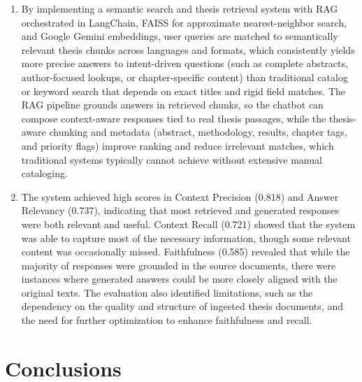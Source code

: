\begin{refsection}
\begin{enumerate}
    \item By implementing a semantic search and thesis retrieval system with RAG orchestrated in LangChain, FAISS for approximate nearest-neighbor search, and Google Gemini embeddings, user queries are matched to semantically relevant thesis chunks across languages and formats, which consistently yields more precise answers to intent-driven questions (such as complete abstracts, author-focused lookups, or chapter-specific content) than traditional catalog or keyword search that depends on exact titles and rigid field matches. The RAG pipeline grounds answers in retrieved chunks, so the chatbot can compose context-aware responses tied to real thesis passages, while the thesis-aware chunking and metadata (abstract, methodology, results, chapter tags, and priority flags) improve ranking and reduce irrelevant matches, which traditional systems typically cannot achieve without extensive manual cataloging.

    \item The system achieved high scores in Context Precision (0.818) and Answer Relevancy (0.737), indicating that most retrieved and generated responses were both relevant and useful. Context Recall (0.721) showed that the system was able to capture most of the necessary information, though some relevant content was occasionally missed. Faithfulness (0.585) revealed that while the majority of responses were grounded in the source documents, there were instances where generated answers could be more closely aligned with the original texts. The evaluation also identified limitations, such as the dependency on the quality and structure of ingested thesis documents, and the need for further optimization to enhance faithfulness and recall. 
\end{enumerate}

\section*{Conclusions}


\end{refsection}
